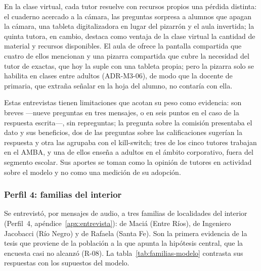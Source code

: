En la clase virtual, cada tutor resuelve con recursos propios una
pérdida distinta: el cuaderno acercado a la cámara, las preguntas
sorpresa a alumnos que apagan la cámara, una tableta digitalizadora en
lugar del pizarrón y el aula invertida; la quinta tutora, en cambio,
destaca como ventaja de la clase virtual la cantidad de material y
recursos disponibles. El aula de \sistema{} ofrece
la pantalla compartida que cuatro de ellos mencionan y una pizarra compartida
que cubre la necesidad del tutor de exactas, que hoy la suple con una
tableta propia; pero la pizarra solo se habilita en clases entre adultos
(ADR-M3-06), de modo que la docente de primaria, que extraña señalar en
la hoja del alumno, no contaría con ella.

Estas entrevistas tienen limitaciones que acotan su peso como evidencia:
son breves ---nueve preguntas en tres mensajes, o en seis puntos en el
caso de la respuesta escrita---, sin repreguntas; la pregunta sobre la
comisión presentaba el dato y sus beneficios, dos de las preguntas sobre
las calificaciones sugerían la respuesta y otra las agrupaba con el
kill-switch; tres de los cinco tutores trabajan en el AMBA, y una de ellos
enseña a adultos en el ámbito corporativo, fuera del segmento escolar. Sus aportes se toman
como la opinión de tutores en actividad sobre el modelo y no como una
medición de su adopción.

\subsubsection{Perfil 4: familias del interior}\label{sec:resultados-perfil4}

Se entrevistó, por mensajes de audio, a tres familias de localidades del
interior (Perfil~4, apéndice~\ref{apx:entrevista}): de Maciá (Entre
Ríos), de Ingeniero Jacobacci (Río Negro) y de Rafaela (Santa Fe). Son la
primera evidencia de la tesis que proviene de la población a la que
apunta la hipótesis central, que la encuesta casi no alcanzó (R-08). La
tabla~\ref{tab:familias-modelo} contrasta sus respuestas con los
supuestos del modelo.

